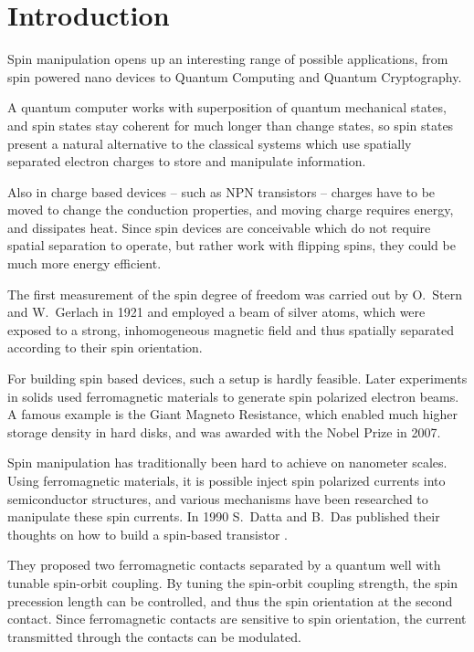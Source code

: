 \chapter{Introduction}

Spin manipulation opens up an interesting range of possible applications, from
spin powered nano devices to Quantum Computing and Quantum Cryptography.

A quantum computer works with superposition of quantum mechanical states, and
spin states stay coherent for much longer than change states, so spin states
present a natural alternative to the classical systems which use spatially
separated electron charges to store and manipulate information.

Also in charge based devices -- such as NPN transistors -- charges have to be
moved to change the conduction properties, and moving charge requires energy,
and dissipates heat. Since spin devices are conceivable which do not require
spatial separation to operate, but rather work with flipping spins, they could
be much more energy efficient.

The first measurement of the spin degree of freedom was carried out by O.~Stern
and W.~Gerlach in 1921 \cite{stern-gerlach} and employed a beam of silver atoms,
which were
exposed to a strong, inhomogeneous magnetic field and thus spatially separated
according to their spin orientation.

For building spin based devices, such a setup is hardly feasible. Later
experiments in solids used ferromagnetic materials to generate spin polarized
electron beams. A famous example is the Giant Magneto Resistance, which
enabled much higher storage density in hard disks, and was awarded with the
Nobel Prize in 2007.

Spin manipulation has traditionally been hard to achieve on nanometer
scales. Using ferromagnetic materials, it is possible inject spin polarized
currents into semiconductor structures, and various mechanisms have been
researched to manipulate these spin currents. In 1990 S.~Datta and B.~Das
published their thoughts on how to build a spin-based
transistor \cite{datta-das}.

They proposed two ferromagnetic contacts separated
by a quantum well with tunable spin-orbit coupling. By tuning the spin-orbit
coupling strength, the spin precession length can be controlled, and thus the
spin orientation at the second contact. Since ferromagnetic contacts are
sensitive to spin orientation, the current transmitted through the contacts can be
modulated.

